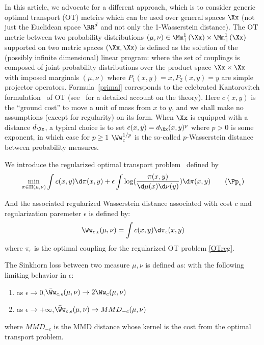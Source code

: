 In this article, we advocate for a different approach, which is to consider generic optimal transport (OT) metrics which can be used over general spaces $\Xx$ (not just the Euclidean space $\RR^d$ and not only the 1-Wasserstein distance). 
%
The OT metric between two probability distributions $(\mu,\nu) \in \Mm_+^1(\Xx) \times \Mm_+^1(\Xx)$ supported on two metric spaces $(\Xx,\Xx)$ is defined as the solution of the (possibly infinite dimensional) linear program:
where the set of couplings is composed of joint probability distributions over the product space $\Xx \times \Xx$ with imposed marginals $(\mu,\nu)$
where $P_1(x,y)=x, P_2(x,y)=y$ are simple projector operators.
%
Formula~\eqref{primal} corresponds to the celebrated Kantorovitch formulation~\cite{Kantorovich42} of OT (see~\cite{santambrogio2015optimal} for a detailed account on the theory). 
%
Here $c(x,y)$ is the ``ground cost'' to move a unit of mass from $x$ to $y$, and we shall make no assumptions (except for regularity) on its form. When $\Xx$ is equipped with a distance $d_\Xx$, a typical choice is to set $c(x,y)=d_\Xx(x,y)^p$ where $p>0$ is some exponent, in which case for $p \geq 1$ $\Ww_c^{1/p}$ is the so-called $p$-Wasserstein distance between probability measures.
 

We introduce the regularized optimal transport problem~\cite{CuturiSinkhorn,2016-genevay-nips} defined by
\begin{equation}\label{OTreg}
\min_{\pi\in\Pi(\mu,\nu)} \int c(x,y) \d\pi(x,y) + \epsilon \int \log(\frac{\pi(x,y)}{\d\mu(x)\d\nu(y)})\d\pi(x,y) \tag{$\Pp_\epsilon$}
\end{equation}


And the associated regularized Wasserstein distance associated with cost $c$ and regularization paremeter $\epsilon$ is defined by:
$$\Ww_{c,\epsilon} (\mu,\nu) = \int c(x,y) \d \pi_\epsilon(x,y)$$ where $\pi_\epsilon$ is the optimal coupling for the regularized OT problem \eqref{OTreg}.
 
\begin{thm}
The Sinkhorn loss between two measure $\mu,\nu$ is defined as:  
with the following limiting behavior in $\epsilon$: \begin{enumerate}
 \item as $\epsilon \rightarrow 0$,\quad $ \bar{\Ww}_{c,\epsilon} (\mu,\nu) \rightarrow 2 \Ww_c(\mu,\nu)  $
 \item as $\epsilon \rightarrow +\infty$,\quad $ \bar{\Ww}_{c,\epsilon} (\mu,\nu) \rightarrow MMD_{-c}(\mu,\nu) $
\end{enumerate}
where $MMD_{-c}$ is the MMD distance whose kernel is the cost from the optimal transport problem.
\end{thm}


